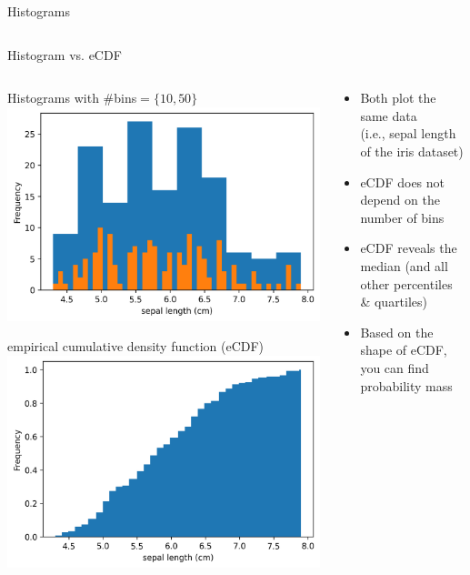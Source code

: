 \documentclass[aspectratio=169]{../latex_main/tntbeamer}  %
\begin{document}
\begin{frame}{Histograms}
\begin{columns}
\begin{column}{.6\textwidth}
            \end{column}
        \end{columns}
    \end{frame}
    
    \begin{frame}[c]{Histogram vs. eCDF}
    
        \vspace{-3em}
        \begin{columns}
            \begin{column}{.5\textwidth}
            
                      \centering
                      Histograms with $\#$bins$=\{10,50\}$ \\
                      \includegraphics[width=.6\textwidth]{04_visualization/figure/hist_iris_sepal_length.png}
                      
                      empirical cumulative density function (eCDF)\\
                      \includegraphics[width=.6\textwidth]{04_visualization/figure/cdf_iris_sepal_length.png.png}
            \end{column}
            
            \begin{column}{.5\textwidth}
            
                \begin{itemize}
                    \item Both plot the same data\\ (i.e., sepal length of the iris dataset)
                    \item eCDF does not depend on the number of bins
                    \item eCDF reveals the median (and all other percentiles \& quartiles)
                    \item Based on the shape of eCDF, you can find probability mass
                \end{itemize}


\end{column}
\end{columns}
\end{frame}
\end{document}
